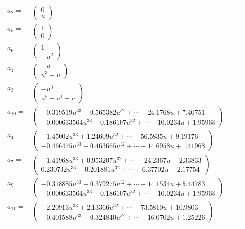 \documentclass[1p]{elsarticle_modified}
\theoremstyle{definition}
\begin{document}
\begin{tabular}{m{7pt} m{180pt} m{7pt} m{180pt} }
\flushright $a_{2}=$&$\begin{pmatrix}0\\u\end{pmatrix}$ \\
\flushright $a_{5}=$&$\begin{pmatrix}1\\0\end{pmatrix}$ \\
\flushright $a_{6}=$&$\begin{pmatrix}1\\- u^2\end{pmatrix}$ \\
\flushright $a_{1}=$&$\begin{pmatrix}- u\\u^3+u\end{pmatrix}$ \\
\flushright $a_{3}=$&$\begin{pmatrix}- u^3\\u^5+u^3+u\end{pmatrix}$ \\
\flushright $a_{10}=$&$\begin{pmatrix}-0.319519 u^{33}+0.565382 u^{32}+\cdots-24.1768 u+7.40751\\-0.000633564 u^{33}+0.186107 u^{32}+\cdots-10.0234 u+1.95968\end{pmatrix}$ \\
\flushright $a_{4}=$&$\begin{pmatrix}-1.45002 u^{33}+1.24609 u^{32}+\cdots-56.5835 u+9.19176\\-0.466475 u^{33}+0.463665 u^{32}+\cdots-14.6958 u+1.41968\end{pmatrix}$ \\
\flushright $a_{7}=$&$\begin{pmatrix}-1.41968 u^{33}+0.953207 u^{32}+\cdots-24.2367 u-2.33833\\0.230732 u^{33}-0.201881 u^{32}+\cdots+6.37702 u-2.17754\end{pmatrix}$ \\
\flushright $a_{9}=$&$\begin{pmatrix}-0.318885 u^{33}+0.379275 u^{32}+\cdots-14.1534 u+5.44783\\-0.000633564 u^{33}+0.186107 u^{32}+\cdots-10.0234 u+1.95968\end{pmatrix}$ \\
\flushright $a_{11}=$&$\begin{pmatrix}-2.20913 u^{33}+2.13366 u^{32}+\cdots-73.5810 u+10.9803\\-0.401588 u^{33}+0.324840 u^{32}+\cdots-16.0702 u+1.25226\end{pmatrix}$ \\

\end{tabular}
\end{document}

